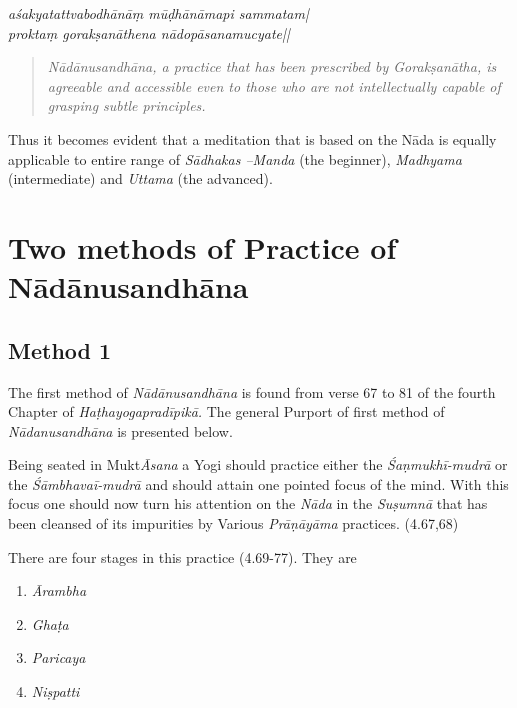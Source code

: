 \begin{shloka}
\textit{aśakyatattvabodhānāṃ mūḍhānāmapi sammatam|}\\
\textit{proktaṃ gorakṣanāthena nādopāsanamucyate||} 
\end{shloka}

\begin{quote}
\textit{Nādānusandhāna, a practice that has been prescribed by Gorakṣanātha, is agreeable and accessible even to those who are not intellectually capable of grasping subtle principles.}
\end{quote}

Thus it becomes evident that a meditation that is based on the Nāda is equally applicable to entire range of \textit{Sādhakas –Manda} (the beginner), \textit{Madhyama} (intermediate) and \textit{Uttama} (the advanced).

\section*{Two methods of Practice of Nādānusandhāna}

\subsection*{Method 1}

The first method of \textit{Nādānusandhāna} is found from verse 67 to 81 of the fourth Chapter of \textit{Haṭhayogapradīpikā.} The general Purport of first method of \textit{Nādanusandhāna} is presented below.

Being seated in Mukt\textit{Āsana} a Yogi should practice either the \textit{Śaṇmukhī-mudrā} or the \textit{Śāmbhavaī-mudrā} and should attain one pointed focus of the mind. With this focus one should now turn his attention on the \textit{Nāda} in the \textit{Suṣumnā} that has been cleansed of its impurities by Various \textit{Prāṇāyāma} practices. (4.67,68)

There are four stages in this practice (4.69-77). They are

\begin{enumerate}
\itemsep=0pt
\renewcommand{\theenumi}{\alph{enumi}}
\renewcommand{\labelenumi}{\theenumi.}
\item \textit{Ārambha}
\item \textit{Ghaṭa}
\item \textit{Paricaya}
\item \textit{Niṣpatti}
\end{enumerate}

